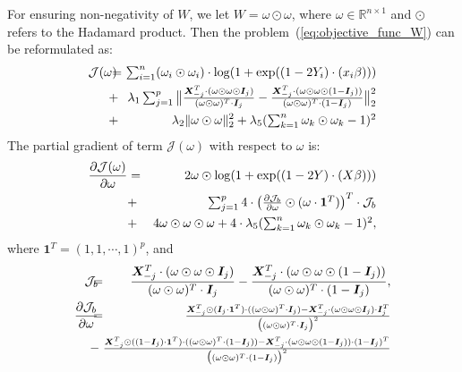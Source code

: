 \documentclass[sigconf]{acmart}
\newcommand*{\Scale}[2][4]{\scalebox{#1}{$#2$}}
\begin{document}
For ensuring non-negativity of $W$, we let $W = \omega \odot \omega$, where $\omega \in \mathbb{R}^{n\times 1}$ and $\odot$ refers to the Hadamard product.
Then the problem~(\ref{eq:objective_func_W}) can be reformulated as:
\begin{eqnarray}
\label{eq:objective_func_omega}
\mathcal{J}(\omega)\!\!\!\! &=& \!\!\!\! \Scale[1.0]{\sum_{i=1}^{n}(\omega_i\odot \omega_i)\cdot \log(1+\exp((1-2Y_i)\cdot (x_i\beta)))} \\
\nonumber&+& \!\!\!\!\!  \Scale[1.0]{\lambda_1 \sum_{j=1}^{p} \big\|\frac{\bm{X}_{-j}^{T}\cdot(\omega\odot \omega\odot \bm{I}_j)}{(\omega\odot \omega)^{T}\cdot \bm{I}_j}-\frac{\bm{X}_{-j}^{T}\cdot(\omega\odot \omega\odot (1-\bm{I}_j))}{(\omega\odot \omega)^{T}\cdot (1-\bm{I}_j)}\big\|_2^2}\\
\nonumber&+& \!\!\!\!\!  \lambda_2 \|\omega\odot \omega\|_2^2 + \Scale[1.0]{\lambda_5 (\sum_{k=1}^{n}\omega_k\odot \omega_k-1)^{2}}
\end{eqnarray}The partial gradient of term $\mathcal{J}(\omega)$ with respect to $\omega$ is:
\begin{eqnarray}
\nonumber\frac{\partial \mathcal{J}(\omega)}{\partial \omega} &=& 2\omega\odot\log(1+\exp((1-2Y)\cdot(X\beta))) \\
\nonumber&+&\Scale[1.0]{\sum_{j=1}^{p} 4\cdot \big(\frac{\partial \mathcal{J}_{b}}{\partial \omega} \odot (\omega\cdot \mathbf{1}^{T})\big)^{T}\cdot \mathcal{J}_{b}}\\
\nonumber&+&4\omega\odot\omega\odot\omega + \Scale[1.0]{4\cdot\lambda_5 (\sum_{k=1}^{n}\omega_k\odot \omega_k-1)^{2}},
\end{eqnarray}
where $\mathbf{1}^{T} = \left( {1,1, \cdots ,1} \right)^p$, and
\begin{eqnarray}
\nonumber \mathcal{J}_{b} \!\!\!\! &=& \!\!\!\! \frac{\bm{X}_{-j}^{T}\cdot(\omega\odot \omega\odot \bm{I}_j)}{(\omega\odot \omega)^{T}\cdot \bm{I}_j}-\frac{\bm{X}_{-j}^{T}\cdot(\omega\odot \omega\odot (1-\bm{I}_j))}{(\omega\odot \omega)^{T}\cdot (1-\bm{I}_j)},\\
\nonumber \frac{\partial \mathcal{J}_b}{\partial \omega} \!\!\!\! &=& \!\!\!\! \Scale[0.95]{\frac{\bm{X}_{-j}^{T}\odot(\bm{I}_j\cdot\mathbf{1}^{T})\cdot((\omega\odot \omega)^{T}\cdot \bm{I}_j) - \bm{X}_{-j}^{T}\cdot (\omega \odot \omega \odot \bm{I}_j)\cdot \bm{I}_j^T}{\big((\omega \odot \omega)^{T}\cdot \bm{I}_j\big)^2}} \\
\nonumber \!\!\!\! &-& \!\!\!\!\!\! \Scale[0.95]{\frac{\bm{X}_{-j}^{T}\odot((1-\bm{I}_j)\cdot\mathbf{1}^{T})\cdot((\omega\odot \omega)^{T}\cdot (1-\bm{I}_j)) - \bm{X}_{-j}^{T}\cdot (\omega \odot \omega \odot (1-\bm{I}_j))\cdot (1-\bm{I}_j)^T}{\big((\omega \odot \omega)^{T}\cdot (1-\bm{I}_j)\big)^2}}
\end{eqnarray}
\end{document}
